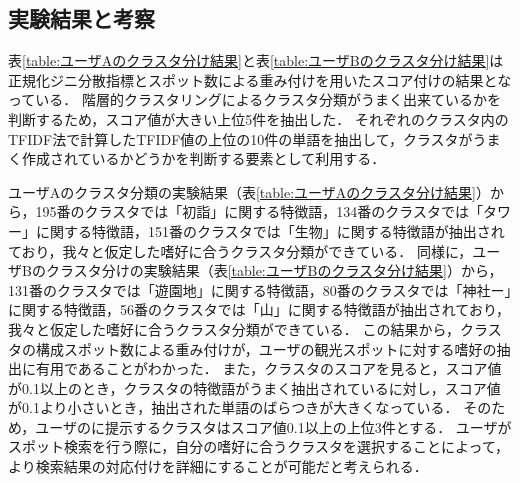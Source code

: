 \documentclass{deimj}
\begin{document}
\subsection{実験結果と考察}
表\ref{table:ユーザAのクラスタ分け結果}と表\ref{table:ユーザBのクラスタ分け結果}は正規化ジニ分散指標とスポット数による重み付けを用いたスコア付けの結果となっている．
階層的クラスタリングによるクラスタ分類がうまく出来ているかを判断するため，スコア値が大きい上位5件を抽出した．
それぞれのクラスタ内のTFIDF法で計算したTFIDF値の上位の10件の単語を抽出して，クラスタがうまく作成されているかどうかを判断する要素として利用する．

ユーザAのクラスタ分類の実験結果（表\ref{table:ユーザAのクラスタ分け結果}）から，195番のクラスタでは「初詣」に関する特徴語，134番のクラスタでは「タワー」に関する特徴語，151番のクラスタでは「生物」に関する特徴語が抽出されており，我々と仮定した嗜好に合うクラスタ分類ができている．
同様に，ユーザBのクラスタ分けの実験結果（表\ref{table:ユーザBのクラスタ分け結果}）から，131番のクラスタでは「遊園地」に関する特徴語，80番のクラスタでは「神社ー」に関する特徴語，56番のクラスタでは「山」に関する特徴語が抽出されており，我々と仮定した嗜好に合うクラスタ分類ができている．
この結果から，クラスタの構成スポット数による重み付けが，ユーザの観光スポットに対する嗜好の抽出に有用であることがわかった．
また，クラスタのスコアを見ると，スコア値が0.1以上のとき，クラスタの特徴語がうまく抽出されているに対し，スコア値が0.1より小さいとき，抽出された単語のばらつきが大きくなっている．
そのため，ユーザのに提示するクラスタはスコア値0.1以上の上位3件とする．
ユーザがスポット検索を行う際に，自分の嗜好に合うクラスタを選択することによって，より検索結果の対応付けを詳細にすることが可能だと考えられる．




\end{document}
